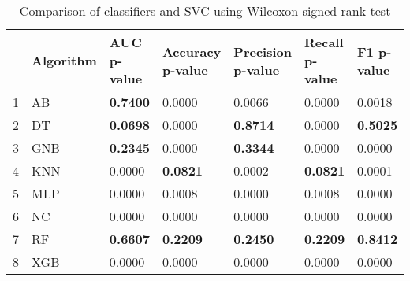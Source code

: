 \begin{table}
\footnotesize
\caption{Comparison of classifiers and SVC using Wilcoxon signed-rank test}
\label{tab:wilcoxon comparison}
\begin{tabular}{lllllll}
\hline
 & Algorithm & AUC p-value & Accuracy p-value & Precision p-value & Recall p-value & F1 p-value \\
\hline
1 & AB & \textbf{0.7400} & 0.0000 & 0.0066 & 0.0000 & 0.0018 \\
2 & DT & \textbf{0.0698} & 0.0000 & \textbf{0.8714} & 0.0000 & \textbf{0.5025} \\
3 & GNB & \textbf{0.2345} & 0.0000 & \textbf{0.3344} & 0.0000 & 0.0000 \\
4 & KNN & 0.0000 & \textbf{0.0821} & 0.0002 & \textbf{0.0821} & 0.0001 \\
5 & MLP & 0.0000 & 0.0008 & 0.0000 & 0.0008 & 0.0000 \\
6 & NC & 0.0000 & 0.0000 & 0.0000 & 0.0000 & 0.0000 \\
7 & RF & \textbf{0.6607} & \textbf{0.2209} & \textbf{0.2450} & \textbf{0.2209} & \textbf{0.8412} \\
8 & XGB & 0.0000 & 0.0000 & 0.0000 & 0.0000 & 0.0000 \\
\hline
\end{tabular}
\end{table}
